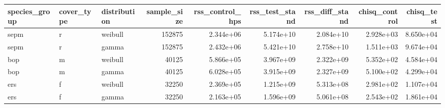 \begin{tabular}{lllrrrrrr}
\toprule
species\_group & cover\_type & distribution & sample\_size & rss\_control\_hps & rss\_test\_stand & rss\_diff\_stand & chisq\_control & chisq\_test \\
\midrule
sepm & r & weibull & 152875 & 2.344e+06 & 5.174e+10 & 2.084e+10 & 2.928e+03 & 8.650e+04 \\
sepm & r & gamma & 152875 & 2.432e+06 & 5.421e+10 & 2.758e+10 & 1.511e+03 & 9.674e+04 \\
bop & m & weibull & 40125 & 5.866e+05 & 3.967e+09 & 2.322e+09 & 5.352e+02 & 4.584e+04 \\
bop & m & gamma & 40125 & 6.028e+05 & 3.915e+09 & 2.327e+09 & 5.100e+02 & 4.299e+04 \\
ers & f & weibull & 32250 & 2.369e+05 & 1.215e+09 & 5.313e+08 & 2.981e+02 & 1.107e+04 \\
ers & f & gamma & 32250 & 2.163e+05 & 1.596e+09 & 5.061e+08 & 2.543e+02 & 1.861e+04 \\
\bottomrule
\end{tabular}
